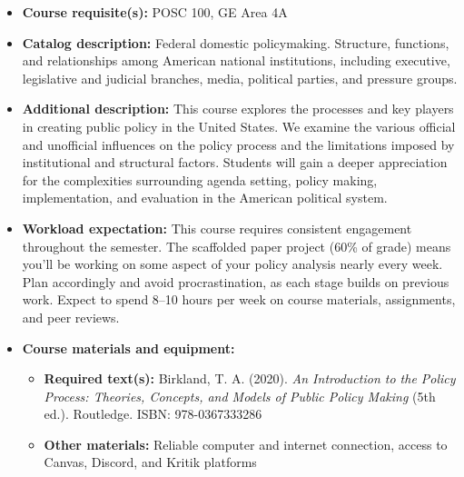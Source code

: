 \documentclass[12pt]{article}     %
\begin{document}
\vspace{0.5em}
\begin{itemize}
  \item \textbf{Course requisite(s):} POSC 100, GE Area 4A 

  \item \textbf{Catalog description:} Federal domestic policymaking. Structure, functions, and relationships among American national institutions, including executive, legislative and judicial branches, media, political parties, and pressure groups.

  \item \textbf{Additional description:} This course explores the processes and key players in creating public policy in the United States. We examine the various official and unofficial influences on the policy process and the limitations imposed by institutional and structural factors. Students will gain a deeper appreciation for the complexities surrounding agenda setting, policy making, implementation, and evaluation in the American political system.

  \item \textbf{Workload expectation:} This course requires consistent engagement throughout the semester. The scaffolded paper project (60\% of grade) means you'll be working on some aspect of your policy analysis nearly every week. Plan accordingly and avoid procrastination, as each stage builds on previous work. Expect to spend 8--10 hours per week on course materials, assignments, and peer reviews.

  \item \textbf{Course materials and equipment:}
  \begin{itemize}
    \item \textbf{Required text(s):} Birkland, T. A. (2020). \emph{An Introduction to the Policy Process: Theories, Concepts, and Models of Public Policy Making} (5th ed.). Routledge. ISBN: 978-0367333286
    \item \textbf{Other materials:} Reliable computer and internet connection, access to Canvas, Discord, and Kritik platforms
  \end{itemize}
\end{itemize}
\end{document}
